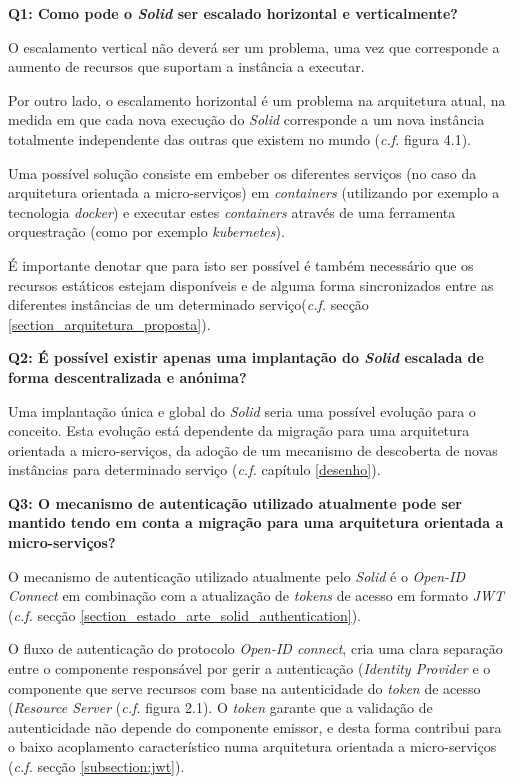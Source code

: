 \newhalfpara

\textbf{Q1: {Como pode o \emph{Solid} ser escalado horizontal e verticalmente?}}

O escalamento vertical não deverá ser um problema, uma vez que corresponde a aumento de recursos que suportam a instância a executar.

Por outro lado, o escalamento horizontal é um problema na arquitetura atual, na medida em que cada nova execução do \emph{Solid} corresponde a um nova instância totalmente independente das outras que existem no mundo (\emph{c.f.} figura 4.1).

Uma possível solução consiste em embeber os diferentes serviços (no caso da arquitetura orientada a micro-serviços) em \emph{containers} (utilizando por exemplo a tecnologia \emph{docker}) e executar estes \emph{containers} através de uma ferramenta orquestração (como por exemplo \emph{kubernetes}).

É importante denotar que para isto ser possível é também necessário que os recursos estáticos estejam disponíveis e de alguma forma sincronizados entre as diferentes instâncias de um determinado serviço(\emph{c.f.} secção \ref{section_arquitetura_proposta}).

\newhalfpara

\textbf{Q2: É possível existir apenas uma implantação do \emph{Solid} escalada de forma descentralizada e anónima?}

Uma implantação única e global do \emph{Solid} seria uma possível evolução para o conceito. Esta evolução está dependente da migração para uma arquitetura orientada a micro-serviços, da adoção de um mecanismo de descoberta de novas instâncias para determinado serviço (\emph{c.f.} capítulo \ref{desenho}).

\newhalfpara

\textbf{Q3: O mecanismo de autenticação utilizado atualmente pode ser mantido tendo em conta a migração para uma arquitetura orientada a micro-serviços?}

O mecanismo de autenticação utilizado atualmente pelo \emph{Solid} é o \emph{Open-ID Connect} em combinação com a atualização de \emph{tokens} de acesso em formato \emph{\acrshort{JWT}} (\emph{c.f.} secção \ref{section_estado_arte_solid_authentication}).

O fluxo de autenticação do protocolo \emph{Open-ID connect}, cria uma clara separação entre o componente responsável por gerir a autenticação (\emph{Identity Provider} e o componente que serve recursos com base na autenticidade do \emph{token} de acesso (\emph{Resource Server} (\emph{c.f.} figura 2.1). O \emph{token} garante que a validação de autenticidade não depende do componente emissor, e desta forma contribui para o baixo acoplamento característico numa arquitetura orientada a micro-serviços (\emph{c.f.} secção \ref{subsection:jwt}).


